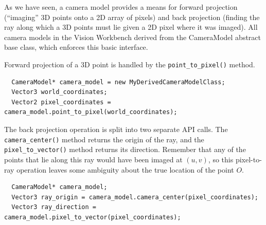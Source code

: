 As we have seen, a camera model provides a means for forward
projection (``imaging'' 3D points onto a 2D array of pixels) and back
projection (finding the ray along which a 3D points must lie given a
2D pixel where it was imaged).  All camera models in the Vision
Workbench derived from the CameraModel abstract base class, which
enforces this basic interface.

Forward projection of a 3D point is handled by the
\verb#point_to_pixel()# method.
\begin{verbatim}
  CameraModel* camera_model = new MyDerivedCameraModelClass;
  Vector3 world_coordinates;
  Vector2 pixel_coordinates = camera_model.point_to_pixel(world_coordinates);
\end{verbatim}


The back projection operation is split into two separate API calls.
The \verb#camera_center()# method returns the origin of the ray, and
the \verb#pixel_to_vector()# method returns its direction.  Remember
that any of the points that lie along this ray would have been imaged
at $(u,v)$, so this pixel-to-ray operation leaves some ambiguity about
the true location of the point $O$.
\begin{verbatim}
  CameraModel* camera_model;  
  Vector3 ray_origin = camera_model.camera_center(pixel_coordinates);
  Vector3 ray_direction = camera_model.pixel_to_vector(pixel_coordinates);
\end{verbatim}
\begin{center}
\end{center}

